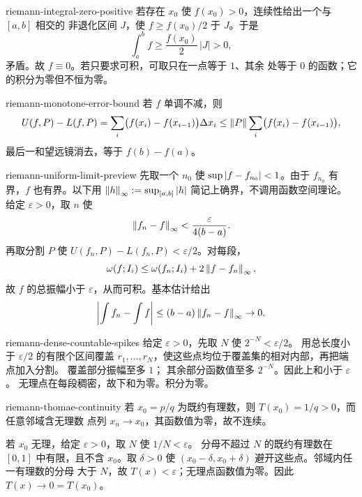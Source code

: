 \begin{solution}{riemann-integral-zero-positive}
若存在 \(x_0\) 使 \(f(x_0)>0\)，连续性给出一个与 \([a,b]\) 相交的
非退化区间 \(J\)，使 \(f\ge f(x_0)/2\) 于 \(J\)。于是
\[
 \int_a^b f\ge \frac{f(x_0)}2\,|J|>0,
\]
矛盾。故 \(f\equiv0\)。若只要求可积，可取只在一点等于 \(1\)、其余
处等于 \(0\) 的函数；它的积分为零但不恒为零。
\end{solution}

\begin{solution}{riemann-monotone-error-bound}
若 \(f\) 单调不减，则
\[
 U(f,P)-L(f,P)
 =\sum_i\bigl(f(x_i)-f(x_{i-1})\bigr)\Delta x_i
 \le\left\lVert P\right\rVert\sum_i\bigl(f(x_i)-f(x_{i-1})\bigr),
\]
最后一和望远镜消去，等于 \(f(b)-f(a)\)。
\end{solution}

\begin{solution}{riemann-uniform-limit-preview}
先取一个 \(n_0\) 使 \(\sup\left|f-f_{n_0}\right|<1\)。由于 \(f_{n_0}\)
有界，\(f\) 也有界。以下用 \(\left\lVert h\right\rVert_\infty:=\sup_{[a,b]}\left|h\right|\)
简记上确界，不调用函数空间理论。
给定 \(\varepsilon>0\)，取 \(n\) 使
\[
 \left\lVert f_n-f\right\rVert_\infty<\frac{\varepsilon}{4(b-a)}.
\]
再取分割 \(P\) 使
\(U(f_n,P)-L(f_n,P)<\varepsilon/2\)。对每段，
\[
 \omega(f;I_i)\le \omega(f_n;I_i)+2\left\lVert f-f_n\right\rVert_\infty,
\]
故 \(f\) 的总振幅小于 \(\varepsilon\)，从而可积。基本估计给出
\[
 \left|\int f_n-\int f\right|
 \le(b-a)\left\lVert f_n-f\right\rVert_\infty\to0.
\]
\end{solution}

\begin{solution}{riemann-dense-countable-spikes}
给定 \(\varepsilon>0\)，先取 \(N\) 使 \(2^{-N}<\varepsilon/2\)。
用总长度小于 \(\varepsilon/2\) 的有限个区间覆盖
\(r_1,\ldots,r_N\)，使这些点均位于覆盖集的相对内部，再把端点加入分割。
覆盖部分振幅至多 \(1\)；
其余部分函数值至多 \(2^{-N}\)。因此上和小于 \(\varepsilon\)。
无理点在每段稠密，故下和为零。积分为零。
\end{solution}

\begin{solution}{riemann-thomae-continuity}
若 \(x_0=p/q\) 为既约有理数，则 \(T(x_0)=1/q>0\)，而任意邻域含无理数
点列 \(x_n\to x_0\)，其函数值为零，故不连续。

若 \(x_0\) 无理，给定 \(\varepsilon>0\)，取 \(N\) 使 \(1/N<\varepsilon\)。
分母不超过 \(N\) 的既约有理数在 \([0,1]\) 中有限，且不含
\(x_0\)。取 \(\delta>0\) 使
\((x_0-\delta,x_0+\delta)\) 避开这些点。邻域内任一有理数的分母
大于 \(N\)，故 \(T(x)<\varepsilon\)；无理点函数值为零。因此
\(T(x)\to0=T(x_0)\)。
\end{solution}

